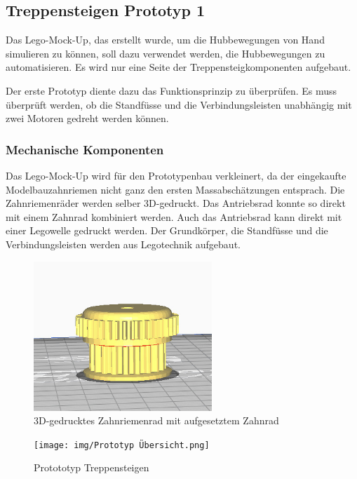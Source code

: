 \newpage
\subsection{Treppensteigen Prototyp 1}
Das Lego-Mock-Up, das erstellt wurde, um die Hubbewegungen von Hand simulieren zu können, soll dazu verwendet werden, die Hubbewegungen zu automatisieren. Es wird nur eine Seite der Treppensteigkomponenten aufgebaut. 

Der erste Prototyp diente dazu das Funktionsprinzip zu überprüfen. Es muss überprüft werden, ob die Standfüsse und die Verbindungsleisten unabhängig mit zwei Motoren gedreht werden können. 

\subsubsection{Mechanische Komponenten}
Das Lego-Mock-Up wird für den Prototypenbau verkleinert, da der eingekaufte Modelbauzahnriemen nicht ganz den ersten Massabschätzungen entsprach. Die Zahnriemenräder werden selber 3D-gedruckt. Das Antriebsrad konnte so direkt mit einem Zahnrad kombiniert werden. Auch das Antriebsrad kann direkt mit einer Legowelle gedruckt werden. Der Grundkörper, die Standfüsse und die Verbindungsleisten werden aus Legotechnik aufgebaut.\\

\begin{figure}[H]
  \includegraphics[width=0.6\textwidth]{img/Zahnrad gedruckt.JPG}
  \centering
  \caption{3D-gedrucktes Zahnriemenrad mit aufgesetztem Zahnrad}
\end{figure}

\begin{figure}[H]
  \texttt{[image: img/Prototyp Übersicht.png]}
  \centering
  \caption{Protototyp Treppensteigen}
\end{figure}

